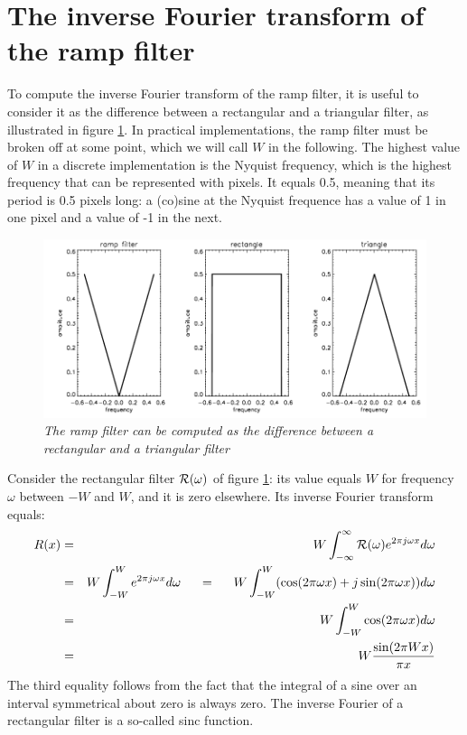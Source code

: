 \newpage
\section{The inverse Fourier transform of the ramp filter \label{app:ramp}}
To compute the inverse Fourier transform of the ramp filter, it is
useful to consider it as the difference between a rectangular and a
triangular filter, as illustrated in figure \ref{fig:rampapp2}. In
practical implementations, the ramp filter must be broken off at some
point, which we will call $W$ in the following. The highest value of
$W$ in a discrete implementation is the Nyquist frequency, which is
the highest frequency that can be represented with pixels. It equals
0.5, meaning that its period is 0.5 pixels long: a (co)sine at the
Nyquist frequence has a value of 1 in one pixel and a value of -1 in
the next.

\begin{figure}[tbh]
\centering
\includegraphics[width=\figmedium]{figs/fig_rampfilter2_app.pdf}
\caption{\label{fig:rampapp2} \emph{The ramp filter can be computed as
    the difference between a rectangular and a triangular filter}}
\end{figure}

Consider the rectangular filter ${\cal R}(\omega)$ of figure  \ref{fig:rampapp2}: its
value equals $W$ for frequency $\omega$ between $-W$ and $W$, and it is
zero elsewhere. Its inverse Fourier transform equals:
\begin{eqnarray}
R(x) & = & W \int_{-\infty}^{\infty} {\cal R}(\omega) e^{2\pi j \omega x} 
           d\omega \nonumber\\
 &=& W \int_{-W}^W e^{2\pi j \omega x} d\omega 
   \hspace{5mm} = \hspace{5mm} 
     W \int_{-W}^W (\cos(2\pi \omega x) + j \sin(2\pi \omega x)) d\omega 
       \nonumber\\
 &=& W \int_{-W}^W \cos(2\pi \omega x) d\omega \nonumber\\
 & = & W \frac{\sin(2\pi W x)}{\pi x} 
\end{eqnarray}
The third equality follows from the fact that the integral of a sine
over an interval symmetrical about zero is always zero. The inverse
Fourier of a rectangular filter is a so-called sinc function.

